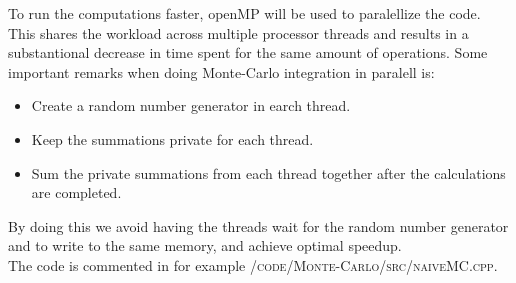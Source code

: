 \documentclass[../main.tex]{subfiles}
\begin{document}
To run the computations faster, openMP will be used to paralellize the code. This shares the workload across multiple processor threads and results in a substantional decrease in time spent for the same amount of operations. Some important remarks when doing Monte-Carlo integration in paralell is:
\begin{itemize}
 \item Create a random number generator in earch thread.
 \item Keep the summations private for each thread.
 \item Sum the private summations from each thread together after the calculations are completed.
\end{itemize}
By doing this we avoid having the threads wait for the random number generator and to write to the same memory, and achieve optimal speedup.
\\
The code is commented in for example \textsc{/code/Monte-Carlo/src/naiveMC.cpp}.
\end{document}
